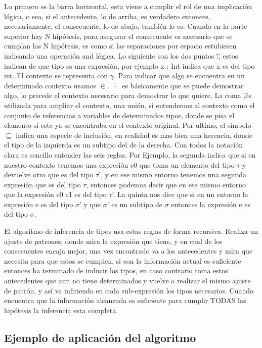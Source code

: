 Lo primero es la barra horizontal, esta viene a cumplir el rol de una implicación lógica, o sea, si el antecedente, lo de arriba, es verdadero entonces, necesariamente, el consecuente, lo de abajo, también lo es. Cuando en la parte superior hay N hipótesis, para asegurar el consecuente es necesario que se cumplan las N hipótesis, es como si las separaciones por espacio estubiesen indicando una operación and lógica.
Lo siguiente son los dos puntos \":\", estos indican de que tipo es una expresión, por ejemplo x : Int indica que x es del tipo int. El contexto se representa con $\gamma$. Para indicar que algo se encuentra en un determinado contexto usamos $\in$. $\vdash$ es básicamente que se puede demostrar algo, lo precede el contexto necesario para demostrar lo que quiere. La coma \",\" es utilizada para ampliar el contexto, una unión, si entendemos al contexto como el conjunto de referencias a variables de determinados tipos, donde se pisa el elemento si este ya se encontraba en el contexto original. Por ultimo, el símbolo $\sqsubseteq$ indica una especie de inclusión, en realidad es mas bien una herencia, donde el tipo de la izquierda es un subtipo del de la derecha.
Con todos la notación clara es sencillo entender las seis reglas.
Por Ejemplo, la segunda indica que si en nuestro contexto tenemos una expresión e0 que  toma un elemento del tipo  $\tau$ y devuelve otro que es del tipo $\tau$', y en ese mismo entorno tenemos una segunda expresión que es del tipo $\tau$, entonces podemos decir que en ese mismo entorno que la expresión e0 e1 es del tipo $\tau$'.
La quinta nos dice que si en un entorno la expresión e es del tipo $\sigma$' y que $\sigma$' es un subtipo de $\sigma$ entonces la expresión e es del tipo  $\sigma$.

El algoritmo de inferencia de tipos usa estas reglas de forma recursiva. Realiza un ajuste de patrones, donde mira la expresión que tiene, y en cual de los consecuentes encaja mejor, una vez encontrado va a los antecedentes y mira que necesita para que estos se cumplen, si con la información actual es suficiente entonces ha terminado de inducir los tipos, en caso contrario toma estos antecedentes que aun no tiene determinados y vuelve a realizar el mismo ajuste de patrón, y así va infiriendo en cada sub-expresión los tipos necesarios. Cuando encuentra que la información alcanzada es suficiente para cumplir TODAS las hipótesis la inferencia esta completa.

\label{sub:algoritmo_de_hindley_milner}

\subsection{Ejemplo de aplicación del algoritmo} %
\label{sub:ejemplo_de_aplicaci_n_del_algoritmo}

